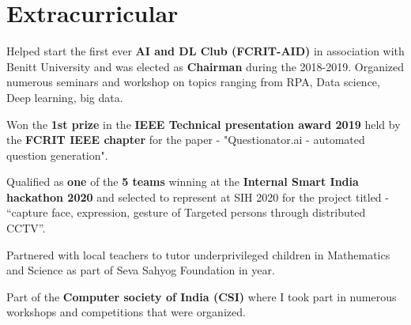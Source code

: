 \documentclass[letterpaper,11pt]{article}
\begin{document}
 
 


\section{Extracurricular}
\begin{itemize}
\small{
    \item Helped start the first ever \textbf{AI and DL Club (FCRIT-AID)} in association with Benitt University and was elected as \textbf{Chairman} during the 2018-2019. Organized numerous seminars and workshop on topics ranging from RPA, Data science, Deep learning, big data.  

    \item Won the \textbf{1st prize} in the \textbf{IEEE Technical presentation award 2019} held by the \textbf{FCRIT IEEE chapter} for the paper - "Questionator.ai - automated question generation". 

    \item Qualified as \textbf{one} of the \textbf{5 teams} winning at the \textbf{Internal Smart India hackathon 2020} and selected to represent at SIH 2020 for the project titled - “capture face, expression, gesture of Targeted persons through distributed CCTV”. 

    \item Partnered with local teachers to tutor underprivileged children in Mathematics and Science as part of Seva Sahyog Foundation in year.  

    \item Part of the \textbf{Computer society of India (CSI)} where I took part in numerous workshops and competitions that were organized. 
    
}

\end{itemize}
\end{document}
